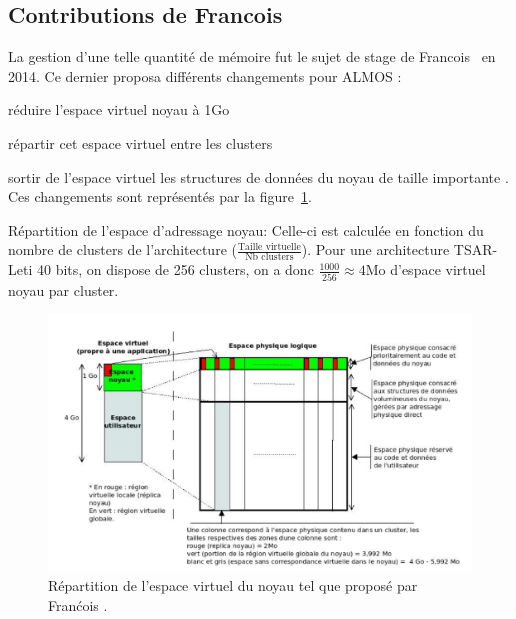       
    \subsection{Contributions de Francois \citeauthor{guerret2014exploitation}}
      
      La gestion d'une telle quantité de mémoire fut le sujet de stage de
      Francois~\citet{guerret2014exploitation} en 2014. Ce dernier proposa
      différents changements pour ALMOS : \benumline \item réduire l'espace
      virtuel noyau à 1Go \item répartir cet espace virtuel entre les
      clusters \item sortir de l'espace virtuel les structures de données du
      noyau de taille importante \eenumline. Ces changements sont représentés
      par la figure~\ref{fig:almos-guerret}.

      \begin{paragraph}{Répartition de l'espace d'adressage noyau:}
        Celle-ci est calculée en fonction du nombre de clusters de
        l'architecture ($\frac{\text{Taille virtuelle}}{\text{Nb
            clusters}}$). Pour une architecture TSAR-Leti 40 bits, on dispose de
        256 clusters, on a donc $\frac{1000}{256}\approx4$Mo d'espace virtuel
        noyau par cluster.
      \end{paragraph}

      \begin{figure}[ht]
        \centering \includegraphics[scale=0.33]{include/img/almos-guerret}
        \caption{Répartition de l'espace virtuel du noyau tel que proposé par
          Franćois \citet{guerret2014exploitation}.}
        \label{fig:almos-guerret}
      \end{figure}

